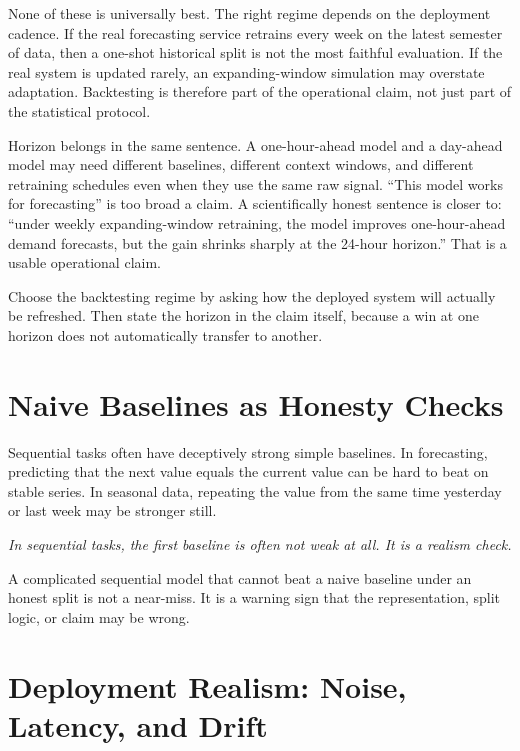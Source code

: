None of these is universally best. The right regime depends on the deployment cadence. If the real forecasting service retrains every week on the latest semester of data, then a one-shot historical split is not the most faithful evaluation. If the real system is updated rarely, an expanding-window simulation may overstate adaptation. Backtesting is therefore part of the operational claim, not just part of the statistical protocol.

Horizon belongs in the same sentence. A one-hour-ahead model and a day-ahead model may need different baselines, different context windows, and different retraining schedules even when they use the same raw signal. ``This model works for forecasting'' is too broad a claim. A scientifically honest sentence is closer to: ``under weekly expanding-window retraining, the model improves one-hour-ahead demand forecasts, but the gain shrinks sharply at the 24-hour horizon.'' That is a usable operational claim.

\begin{decisionbox}
Choose the backtesting regime by asking how the deployed system will actually be refreshed. Then state the horizon in the claim itself, because a win at one horizon does not automatically transfer to another.
\end{decisionbox}

\section{Naive Baselines as Honesty Checks}

Sequential tasks often have deceptively strong simple baselines. In forecasting, predicting that the next value equals the current value can be hard to beat on stable series. In seasonal data, repeating the value from the same time yesterday or last week may be stronger still.

\begin{center}
\emph{In sequential tasks, the first baseline is often not weak at all. It is a realism check.}
\end{center}

A complicated sequential model that cannot beat a naive baseline under an honest split is not a near-miss. It is a warning sign that the representation, split logic, or claim may be wrong.

\section{Deployment Realism: Noise, Latency, and Drift}

